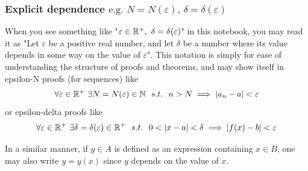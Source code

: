 \subsubsection{Explicit dependence \texorpdfstring{\(\text{e.g. } N = N(\varepsilon) \text{, } \delta = \delta(\varepsilon)\)}{PDFstring}}
When you see something like "\(\varepsilon \in \mathbb{R}^+, \ \delta = \delta(\varepsilon)\)" in this notebook, you may read it as "Let \(\varepsilon\) be a positive real number, and let \(\delta\) be a number where its value depends in some way on the value of \(\varepsilon\)". This notation is simply for ease of understanding the structure of proofs and theorems, and may show itself in epsilon-N proofs (for sequences) like
\begin{equation}
    \forall \varepsilon \in \mathbb{R}^+ \ \exists N = N(\varepsilon) \in \mathbb{N} \ \ s.t. \ \  n > N \implies |a_n - a| < \varepsilon
\end{equation}
or epsilon-delta proofs like
\begin{equation}
    \forall \varepsilon \in \mathbb{R}^{+} \ \exists \delta = \delta(\varepsilon) \in \mathbb{R}^{+} \ \ s.t. \ \  0 < |x - a| < \delta \implies |f(x) - b| < \varepsilon
\end{equation}

In a similar manner, if \(y \in A\) is defined as an expression containing \(x \in B\), one may also write \(y = y(x)\) since \(y\) depends on the value of \(x\).